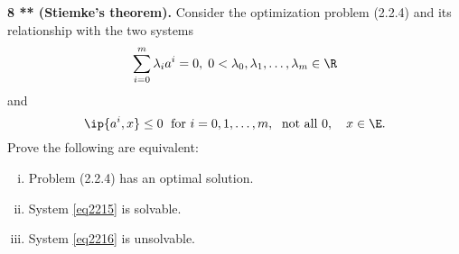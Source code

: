 \documentclass[../borwein-lewis_notes.tex]{subfiles}
\begin{document}
\noindent \textbf{8 ** (Stiemke's theorem).} Consider the optimization 
problem (2.2.4) and its relationship with the two systems 
\begin{equation}
\label{eq2215}
\sum_{i=0}^m \lambda_ia^i = 0, \; 0< \lambda_0,\lambda_1,\ldots,\lambda_m
\in\R
\end{equation}
and 
\begin{equation}
\label{eq2216}
\ip{a^i, x}\leq 0\;\text{ for } i=0,1,\ldots,m,\;\text{ not all }0,
\quad x\in\E.
\end{equation}
Prove the following are equivalent:
\begin{enumerate}[(i)]
\item Problem (2.2.4) has an optimal solution.
\item System \eqref{eq2215} is solvable. 
\item System \eqref{eq2216} is unsolvable.
\end{enumerate}
\end{document}
